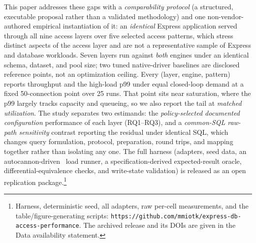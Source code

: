 This paper addresses these gaps with a \emph{comparability protocol} (a structured, executable
proposal rather than a validated methodology) and one non-vendor-authored empirical instantiation of
it: an \emph{identical} Express application served through all nine access layers over five selected
access patterns, which stress distinct aspects of the access layer and are not a representative
sample of Express and database workloads. Seven layers run against \emph{both} engines under an
identical schema, dataset, and pool size; two tuned native-driver baselines are disclosed reference
points, not an optimization ceiling. Every (layer, engine, pattern) reports throughput and the
high-load p99 under equal closed-loop demand at a fixed 50-connection point over 25 runs. That point
sits near saturation, where the p99 largely tracks capacity and queueing, so we also report the tail
at \emph{matched utilization}.
The study separates two estimands: the \emph{policy-selected documented configuration}
performance of each layer (RQ1--RQ3), and a \emph{common-SQL raw-path sensitivity} contrast reporting
the residual under identical SQL, which changes query formulation, protocol, preparation, round trips,
and mapping together rather than isolating any one. The full harness (adapters, seed data, an
autocannon-driven~\cite{autocannon} load runner, a specification-derived expected-result oracle,
differential-equivalence checks, and write-state validation) is released as an open replication
package.\footnote{Harness, deterministic seed, all adapters, raw per-cell measurements, and the
table/figure-generating scripts: \texttt{https://github.com/mmiotk/express-db-access-performance}.
The archived release and its DOIs are given in the Data availability statement.}

